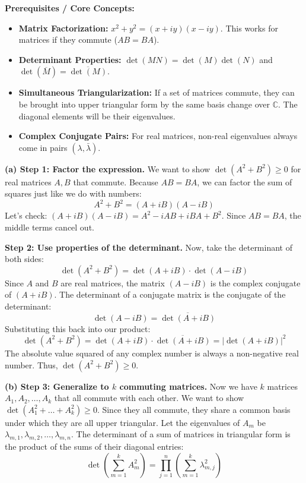 \begin{solution}
\textbf{Prerequisites / Core Concepts:}
\begin{itemize}
    \item \textbf{Matrix Factorization:} $x^2 + y^2 = (x+iy)(x-iy)$. This works for matrices if they commute ($AB=BA$).
    \item \textbf{Determinant Properties:} $\det(MN) = \det(M)\det(N)$ and $\det(\overline{M}) = \overline{\det(M)}$.
    \item \textbf{Simultaneous Triangularization:} If a set of matrices commute, they can be brought into upper triangular form by the same basis change over $\mathbb{C}$. The diagonal elements will be their eigenvalues.
    \item \textbf{Complex Conjugate Pairs:} For real matrices, non-real eigenvalues always come in pairs $(\lambda, \bar{\lambda})$.
\end{itemize}

\textbf{(a) Step 1: Factor the expression.}
We want to show $\det(A^2 + B^2) \geq 0$ for real matrices $A, B$ that commute.
Because $AB = BA$, we can factor the sum of squares just like we do with numbers:
\[ A^2 + B^2 = (A + iB)(A - iB) \]
Let's check: $(A+iB)(A-iB) = A^2 - iAB + iBA + B^2$. Since $AB=BA$, the middle terms cancel out.

\textbf{Step 2: Use properties of the determinant.}
Now, take the determinant of both sides:
\[ \det(A^2 + B^2) = \det(A + iB) \cdot \det(A - iB) \]
Since $A$ and $B$ are real matrices, the matrix $(A - iB)$ is the complex conjugate of $(A + iB)$.
The determinant of a conjugate matrix is the conjugate of the determinant:
\[ \det(A - iB) = \overline{\det(A + iB)} \]
Substituting this back into our product:
\[ \det(A^2 + B^2) = \det(A + iB) \cdot \overline{\det(A + iB)} = | \det(A + iB) |^2 \]
The absolute value squared of any complex number is always a non-negative real number.
Thus, $\det(A^2 + B^2) \geq 0$.

\textbf{(b) Step 3: Generalize to $k$ commuting matrices.}
Now we have $k$ matrices $A_1, A_2, \dots, A_k$ that all commute with each other. We want to show $\det(A_1^2 + \dots + A_k^2) \geq 0$.
Since they all commute, they share a common basis under which they are all upper triangular. Let the eigenvalues of $A_m$ be $\lambda_{m,1}, \lambda_{m,2}, \dots, \lambda_{m,n}$.
The determinant of a sum of matrices in triangular form is the product of the sums of their diagonal entries:
\[ \det\left(\sum_{m=1}^k A_m^2\right) = \prod_{j=1}^n \left( \sum_{m=1}^k \lambda_{m,j}^2 \right) \]


\end{solution}
